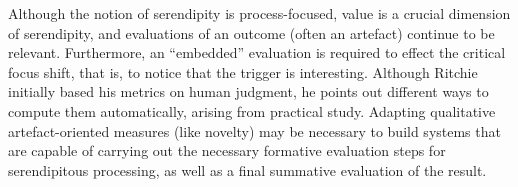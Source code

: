 %

Although the notion of serendipity is process-focused, value is a crucial dimension of serendipity, and evaluations of an outcome (often an artefact) continue to be relevant.  Furthermore, an ``embedded'' evaluation is required to effect the critical focus shift, that is, to notice that the trigger is interesting.  Although Ritchie initially based his metrics on human judgment, he points out different ways to compute them automatically, arising from practical study.  Adapting qualitative artefact-oriented measures (like novelty) may be necessary to build systems that are capable of carrying out the necessary formative evaluation steps for serendipitous processing, as well as a final summative evaluation of the result.  
